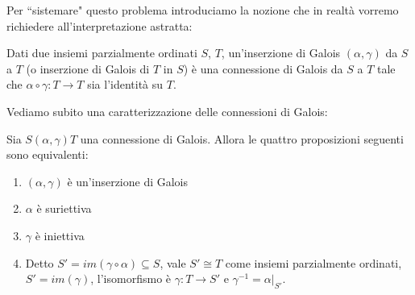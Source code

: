 \documentclass[12pt]{article}
\numberwithin{theorem}{subsection}
\begin{document}
Per ``sistemare" questo problema introduciamo la nozione che in realtà vorremo richiedere all'interpretazione astratta:
\begin{definition}
	Dati due insiemi parzialmente ordinati $S$, $T$, un'inserzione di Galois $(\alpha, \gamma)$ da $S$ a $T$ (o inserzione di Galois di $T$ in $S$) è una connessione di Galois da $S$ a $T$ tale che $\alpha \circ \gamma : T \rightarrow T$ sia l'identità su $T$.
\end{definition}

Vediamo subito una caratterizzazione delle connessioni di Galois:
\begin{prop}
	Sia $S (\alpha, \gamma) T$ una connessione di Galois. Allora le quattro proposizioni seguenti sono equivalenti:
	\begin{enumerate}[label={(\arabic*)}]
		\item $(\alpha, \gamma)$ è un'inserzione di Galois
		\item $\alpha$ è suriettiva
		\item $\gamma$ è iniettiva
		\item Detto $S' = im(\gamma \circ \alpha) \subseteq S$, vale $S' \cong T$ come insiemi parzialmente ordinati, $S' = im(\gamma)$, l'isomorfismo è $\gamma: T \rightarrow S'$ e $\gamma^{-1} = \left. \alpha \right|_{S'}$.
	\end{enumerate}
\end{prop}
\end{document}
